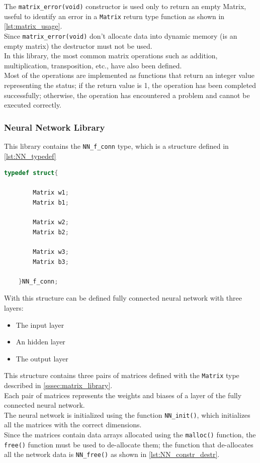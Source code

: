 \noindent
The \texttt{matrix\_error(void)} constructor is used only to return an empty Matrix, useful to identify an error in a \texttt{Matrix} return type function as shown in \autoref{lst:matrix_usage}. \\
Since \texttt{matrix\_error(void)} don't allocate data into dynamic memory (is an empty matrix) the destructor must not be used. \\
In this library, the most common matrix operations such as addition, multiplication, transposition, etc., have also been defined.\\
Most of the operations are implemented as functions that return an integer value representing the status; if the return value is 1, the operation has been completed successfully; otherwise, the operation has encountered a problem and cannot be executed correctly.

\newpage
\subsubsection{Neural Network Library}

This library contains the \texttt{NN\_f\_conn} type, which is a structure defined in 
\autoref{lst:NN_typedef}

\vspace{1em}
\begin{lstlisting}[language=C, caption={NN\_f\_conn type}, label={lst:NN_typedef}, morekeywords={NN\_f\_conn, Matrix}, alsoletter={\_}]
    typedef struct{
        
        Matrix w1;
        Matrix b1;
    
        Matrix w2;
        Matrix b2;
    
        Matrix w3;
        Matrix b3;
    
    }NN_f_conn;
\end{lstlisting}

\noindent
With this structure can be defined fully connected neural network with three layers:

\begin{itemize}
    \setlength\itemsep{0pt}
    \setlength\parskip{0pt}
    \item The input layer
    \item An hidden layer
    \item The output layer
\end{itemize}

\noindent
This structure contains three pairs of matrices defined with the \texttt{Matrix} type described in \autoref{sssec:matrix_library}. \\
Each pair of matrices represents the weights and biases of a layer of the fully connected neural network. \\
The neural network is initialized using the function \texttt{NN\_init()}, which initializes all the matrices with the correct dimensions. \\
Since the matrices contain data arrays allocated using the \texttt{malloc()} function, the \texttt{free()} function must be used to de-allocate them; the function that de-allocates all the network data is \texttt{NN\_free()} as shown in \autoref{lst:NN_constr_destr}.

